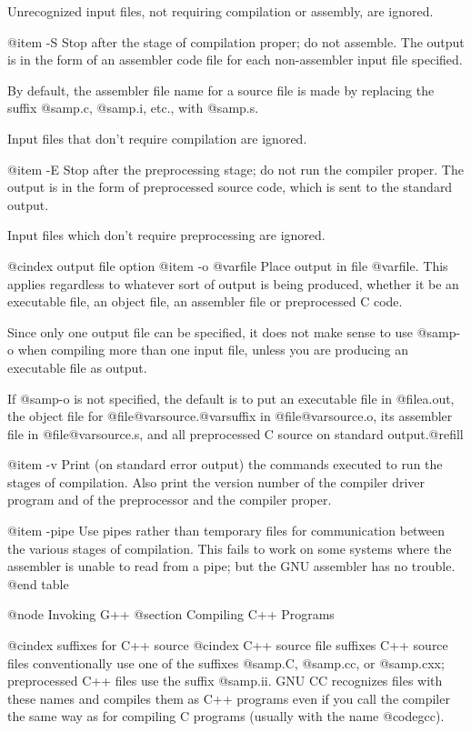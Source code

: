 Unrecognized input files, not requiring compilation or assembly, are
ignored.

@item -S
Stop after the stage of compilation proper; do not assemble.  The output
is in the form of an assembler code file for each non-assembler input
file specified.

By default, the assembler file name for a source file is made by
replacing the suffix @samp{.c}, @samp{.i}, etc., with @samp{.s}.

Input files that don't require compilation are ignored.

@item -E
Stop after the preprocessing stage; do not run the compiler proper.  The
output is in the form of preprocessed source code, which is sent to the
standard output.

Input files which don't require preprocessing are ignored.

@cindex output file option
@item -o @var{file}
Place output in file @var{file}.  This applies regardless to whatever
sort of output is being produced, whether it be an executable file,
an object file, an assembler file or preprocessed C code.

Since only one output file can be specified, it does not make sense to
use @samp{-o} when compiling more than one input file, unless you are
producing an executable file as output.

If @samp{-o} is not specified, the default is to put an executable file
in @file{a.out}, the object file for @file{@var{source}.@var{suffix}} in
@file{@var{source}.o}, its assembler file in @file{@var{source}.s}, and
all preprocessed C source on standard output.@refill

@item -v
Print (on standard error output) the commands executed to run the stages
of compilation.  Also print the version number of the compiler driver
program and of the preprocessor and the compiler proper.

@item -pipe
Use pipes rather than temporary files for communication between the
various stages of compilation.  This fails to work on some systems where
the assembler is unable to read from a pipe; but the GNU assembler has
no trouble.
@end table

@node Invoking G++
@section Compiling C++ Programs

@cindex suffixes for C++ source
@cindex C++ source file suffixes
C++ source files conventionally use one of the suffixes @samp{.C},
@samp{.cc}, or @samp{.cxx}; preprocessed C++ files use the suffix
@samp{.ii}.  GNU CC recognizes files with these names and compiles
them as C++ programs even if you call the compiler the same way as for
compiling C programs (usually with the name @code{gcc}).

